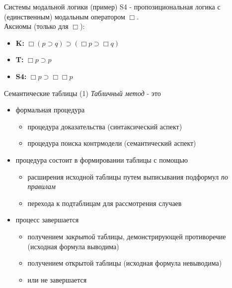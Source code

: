 \documentclass{beamer}
\begin{document}
\begin{frame}{Системы модальной логики (пример)}
S4 - пропозициональная логика с (единственным) модальным оператором $\Box$.\\
\bigskip
Аксиомы (только для $\Box$):
\begin{itemize}
  \item \textbf{K:} $\Box (p \supset q) \supset ( \Box p \supset \Box q)$
  \item \textbf{T:} $\Box p \supset p$
  \item \textbf{S4:} $\Box p \supset \Box \Box p$
\end{itemize}
\end{frame}

\begin{frame}{Семантические таблицы (1)}
\textit{Табличный метод} - это \\
\bigskip
\begin{itemize}
  \item формальная процедура
    \begin{itemize}
      \item процедура доказательства (синтаксический аспект)
      \item процедура поиска контрмодели (семантический аспект)
    \end{itemize}
  \item процедура состоит в формировании таблицы с помощью 
    \begin{itemize}
      \item расширения исходной таблицы путем выписывания подформул \textit{по правилам}
      \item перехода к подтаблицам для рассмотрения случаев
    \end{itemize}  
  \item процесс завершается 
    \begin{itemize}
      \item получением \textit{закрытой} таблицы, демонстрирующей противоречие (исходная формула выводима)
      \item получением открытой таблицы (исходная формула невыводима)
      \item или не завершается
    \end{itemize}
\end{itemize}
\end{frame}
\end{document}
